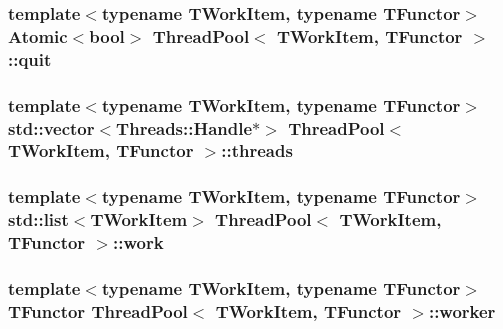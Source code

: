 \subsubsection[{\texorpdfstring{quit}{quit}}]{\setlength{\rightskip}{0pt plus 5cm}template$<$typename T\+Work\+Item, typename T\+Functor$>$ {\bf Atomic}$<$bool$>$ {\bf Thread\+Pool}$<$ T\+Work\+Item, T\+Functor $>$\+::quit\hspace{0.3cm}{\ttfamily [protected]}}\hypertarget{class_thread_pool_adb492ef4e81a157c98302daea9aeb737}{}\label{class_thread_pool_adb492ef4e81a157c98302daea9aeb737}
\subsubsection[{\texorpdfstring{threads}{threads}}]{\setlength{\rightskip}{0pt plus 5cm}template$<$typename T\+Work\+Item, typename T\+Functor$>$ std\+::vector$<${\bf Threads\+::\+Handle}$\ast$$>$ {\bf Thread\+Pool}$<$ T\+Work\+Item, T\+Functor $>$\+::threads\hspace{0.3cm}{\ttfamily [protected]}}\hypertarget{class_thread_pool_ab0f1d51386c0070f4752a256ca2534ff}{}\label{class_thread_pool_ab0f1d51386c0070f4752a256ca2534ff}
\subsubsection[{\texorpdfstring{work}{work}}]{\setlength{\rightskip}{0pt plus 5cm}template$<$typename T\+Work\+Item, typename T\+Functor$>$ std\+::list$<$T\+Work\+Item$>$ {\bf Thread\+Pool}$<$ T\+Work\+Item, T\+Functor $>$\+::work\hspace{0.3cm}{\ttfamily [protected]}}\hypertarget{class_thread_pool_a65b1014672bad573aa4b161e9258f121}{}\label{class_thread_pool_a65b1014672bad573aa4b161e9258f121}
\subsubsection[{\texorpdfstring{worker}{worker}}]{\setlength{\rightskip}{0pt plus 5cm}template$<$typename T\+Work\+Item, typename T\+Functor$>$ T\+Functor {\bf Thread\+Pool}$<$ T\+Work\+Item, T\+Functor $>$\+::worker\hspace{0.3cm}{\ttfamily [protected]}}\hypertarget{class_thread_pool_acf21a97033a7a3dc8852c2621dc10e7f}{}\label{class_thread_pool_acf21a97033a7a3dc8852c2621dc10e7f}
